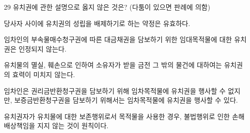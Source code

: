\begin{question}{29}
유치권에 관한 설명으로 옳지 않은 것은? (다툼이 있으면 판례에 의함)
\begin{choices}
  \item 당사자 사이에 유치권의 성립을 배제하기로 하는 약정은 유효하다.
  \item 임차인의 부속물매수청구권에 따른 대금채권을 담보하기 위한 임대목적물에 대한 유치권은 인정되지 않는다.
  \item 유치물의 멸실, 훼손으로 인하여 소유자가 받을 금전 그 밖의 물건에 대하여는 유치권의 효력이 미치지 않는다.
  \item 임차인은 권리금반환청구권을 담보하기 위해 임차목적물에 유치권을 행사할 수 없지만, 보증금반환청구권을 담보하기 위해서는 임차목적물에 유치권을 행사할 수 있다.
  \item 유치권자가 유치물에 대한 보존행위로서 목적물을 사용한 경우, 불법행위로 인한 손해배상책임을 지지 않는 것이 원칙이다.
\end{choices}
\end{question}
